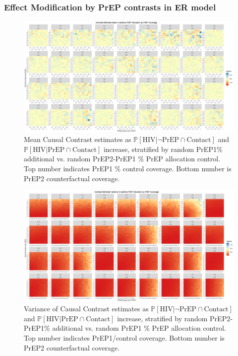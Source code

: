 \documentclass{article}
\theoremstyle{definition}
\begin{document}
\subsubsection{Effect Modification by PrEP contrasts in ER model}
\begin{figure}[H]
    \centering
    \includegraphics[width=\linewidth]{Figures/PrEP Additive Mean Plots.png}
    \caption{Mean Causal Contrast estimates as $\mathbb{P}\left[\text{HIV} \vert \neg \text{PrEP} \cap \text{Contact}\right]$ and $\mathbb{P}\left[\text{HIV} \vert \text{PrEP} \cap \text{Contact}\right]$ increase, stratified by random PrEP1\% additional vs. random PrEP2-PrEP1 \% PrEP allocation control. Top number indicates PrEP1 \% control coverage. Bottom number is PrEP2 counterfactual coverage. }
    \label{fig:Figure 17}
\end{figure}
\begin{figure}[H]
    \centering
    \includegraphics[width=\linewidth]{Figures/PrEP Additive Variance Plots.png}
    \caption{Variance of Causal Contrast estimates as $\mathbb{P}\left[\text{HIV} \vert \neg \text{PrEP} \cap \text{Contact}\right]$ and $\mathbb{P}\left[\text{HIV} \vert \text{PrEP} \cap \text{Contact}\right]$ increase, stratified by random PrEP2-PrEP1\% additional vs. random PrEP1 \% PrEP allocation control. Top number indicates PrEP1/control coverage. Bottom number is PrEP2 counterfactual coverage.}
    \label{fig:Figure 18}
\end{figure}
\end{document}
